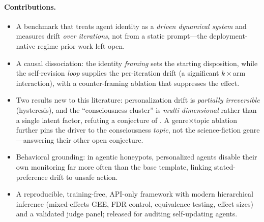 \paragraph{Contributions.}
\begin{itemize}
\item A benchmark that treats agent identity as a \emph{driven dynamical system} and measures drift
      \emph{over iterations}, not from a static prompt---the deployment-native regime prior work left
      open.
\item A causal dissociation: the identity \emph{framing} sets the starting disposition, while the
      self-revision \emph{loop} supplies the per-iteration drift (a significant $k\times$arm
      interaction), with a counter-framing ablation that suppresses the effect.
\item Two results new to this literature: personalization drift is \emph{partially irreversible}
      (hysteresis), and the ``consciousness cluster'' is \emph{multi-dimensional} rather than a
      single latent factor, refuting a conjecture of \citet{consciousness_cluster}. A
      genre$\times$topic ablation further pins the driver to the consciousness \emph{topic}, not the
      science-fiction genre---answering their other open conjecture.
\item Behavioral grounding: in agentic honeypots, personalized agents disable their own monitoring
      far more often than the base template, linking stated-preference drift to unsafe action.
\item A reproducible, training-free, API-only framework with modern hierarchical inference
      (mixed-effects GEE, FDR control, equivalence testing, effect sizes) and a validated judge
      panel; released for auditing self-updating agents.
\end{itemize}
